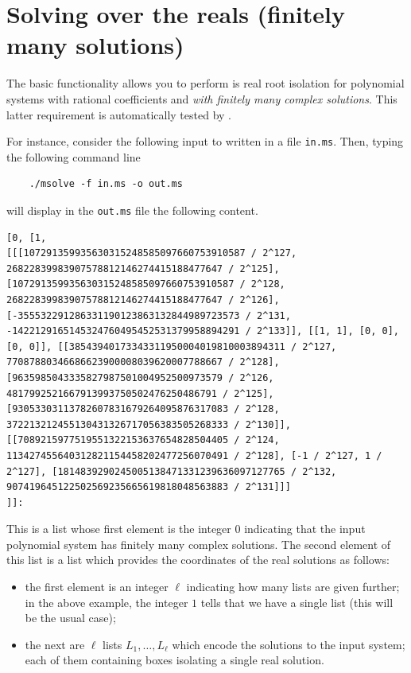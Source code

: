 \documentclass[a4paper,english,11pt]{scrartcl}
\theoremstyle{definition}
\theoremstyle{remark}
\begin{document}
\section{Solving over the reals (finitely many solutions)}\label{sec:solvingreals}

The basic functionality \msolve allows you to perform is real root
isolation for polynomial systems with rational coefficients and {\em with
  finitely many complex solutions}. This latter requirement is automatically
tested by \msolve.

For instance, consider the following input to \msolve written in a file
\verb+in.ms+.
Then, typing the following command line
\begin{tcolorbox} %
  \begin{verbatim}
    ./msolve -f in.ms -o out.ms
  \end{verbatim}
\end{tcolorbox}
will display in the \verb+out.ms+ file the following content.
\begin{tcolorbox} %
  \begin{lstlisting}
[0, [1,
[[[107291359935630315248585097660753910587 / 2^127, 26822839983907578812146274415188477647 / 2^125], [107291359935630315248585097660753910587 / 2^128, 26822839983907578812146274415188477647 / 2^126], [-355532291286331190123863132844989723573 / 2^131, -1422129165145324760495452531379958894291 / 2^133]], [[1, 1], [0, 0], [0, 0]], [[38543940173343311950004019810003894311 / 2^127, 77087880346686623900008039620007788667 / 2^128], [9635985043335827987501004952500973579 / 2^126, 4817992521667913993750502476250486791 / 2^125], [93053303113782607831679264095876317083 / 2^128, 372213212455130431326717056383505268333 / 2^130]], [[7089215977519551322153637654828504405 / 2^124, 113427455640312821154458202477256070491 / 2^128], [-1 / 2^127, 1 / 2^127], [1814839290245005138471331239636097127765 / 2^132, 907419645122502569235665619818048563883 / 2^131]]]
]]:
  \end{lstlisting}
\end{tcolorbox}
This is a list whose first element is the integer $0$ indicating that the input
polynomial system has finitely many complex solutions. The second element of
this list is a list which provides the coordinates of the real solutions as
follows:
\begin{itemize}
\item the first element is an integer $\ell$ indicating how many lists are given
  further; in the above example, the integer $1$ tells that we have a single
  list (this will be the usual case);
\item the next are $\ell$ lists $L_1, \ldots, L_\ell$ which encode the solutions
  to the input system; each of them containing boxes isolating a single real
  solution.
\end{itemize}
\end{document}
